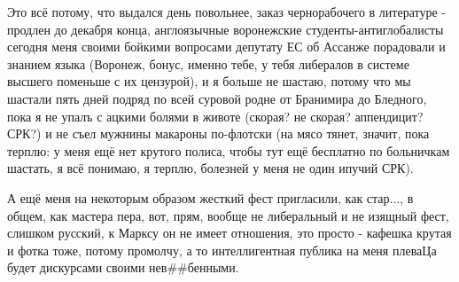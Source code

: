 Это всё потому, что выдался день повольнее, заказ чернорабочего в литературе -
продлен до декабря конца,  англоязычные воронежские  студенты-антиглобалисты
сегодня меня своими бойкими вопросами депутату ЕС об Ассанже порадовали и
знанием языка (Воронеж, бонус, именно тебе, у тебя либералов в системе высшего
поменьше с их цензурой), и я больше не шастаю, потому что мы шастали пять дней
подряд по всей суровой родне от Бранимира до Бледного, пока я не упалъ с ацкими
болями в животе (скорая? не скорая? аппендицит? СРК?) и не съел мужнины
макароны по-флотски (на мясо тянет, значит, пока терплю: у меня ещё нет крутого
полиса, чтобы тут ещё бесплатно по больничкам шастать, я всё понимаю, я терплю,
болезней у меня не один ипучий СРК).

А ещё меня на некоторым образом жесткий фест пригласили, как стар..., в общем,
как мастера пера, вот, прям, вообще не либеральный и не изящный фест, слишком
русский, к Марксу он не имеет отношения, это просто - кафешка крутая и фотка
тоже,  потому промолчу, а то интеллигентная публика на меня плеваЦа будет
дискурсами своими нев\#\#бенными.


